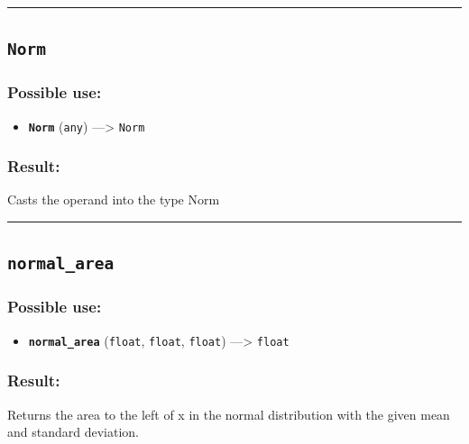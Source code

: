 \documentclass[]{book}
\providecommand{\tightlist}{%
  \setlength{\itemsep}{0pt}\setlength{\parskip}{0pt}}
\theoremstyle{definition}
\theoremstyle{definition}
\theoremstyle{definition}
\theoremstyle{remark}
\begin{document}
\begin{center}\rule{0.5\linewidth}{\linethickness}\end{center}

\subsection{\texorpdfstring{\texttt{Norm}}{Norm}}\label{norm-1}

\subsubsection{Possible use:}\label{possible-use-376}

\begin{itemize}
\tightlist
\item
  \textbf{\texttt{Norm}} (\texttt{any}) ---\textgreater{} \texttt{Norm}
\end{itemize}

\subsubsection{Result:}\label{result-362}

Casts the operand into the type Norm

\begin{center}\rule{0.5\linewidth}{\linethickness}\end{center}

\subsection{\texorpdfstring{\texttt{normal\_area}}{normal\_area}}\label{normal_area}

\subsubsection{Possible use:}\label{possible-use-377}

\begin{itemize}
\tightlist
\item
  \textbf{\texttt{normal\_area}} (\texttt{float}, \texttt{float},
  \texttt{float}) ---\textgreater{} \texttt{float}
\end{itemize}

\subsubsection{Result:}\label{result-363}

Returns the area to the left of x in the normal distribution with the
given mean and standard deviation.
\end{document}

